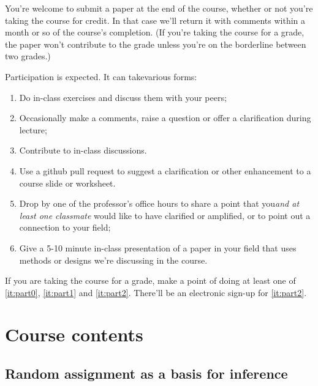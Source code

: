\documentclass[12pt]{article}
\begin{document}
You're welcome to submit a paper at the end of the course, whether or not you're taking the course for credit.  In that case we'll return it with comments within a month or so of the course's completion.  (If you're taking the course for a grade, the paper won't contribute to the grade unless you're on  the borderline between two grades.) 

Participation is expected.  It can takevarious forms:
\begin{enumerate}
\item Do in-class exercises and discuss them with your peers;
\item Occasionally make a comments, raise a question or offer a clarification
  during lecture;
\item Contribute to in-class discussions.
\item \label{it:part0} Use a github pull request to suggest a clarification or other enhancement to
  a course slide or worksheet.
\item \label{it:part1} Drop by one of the professor's office hours to share a point
  that you\textit{and at least one classmate} would like to have clarified or
  amplified, or to point out a connection to your field; 
\item \label{it:part2} Give a 5-10 minute in-class presentation of a paper in your
  field that uses methods or designs we're discussing in the course.
\end{enumerate}
If you are taking the course for a grade, make a point of doing at
least one of \ref{it:part0}, \ref{it:part1} and \ref{it:part2}.  There'll be an
electronic sign-up for \ref{it:part2}.



\section{Course contents}

\subsection{Random assignment as a basis for inference}
\end{document}
